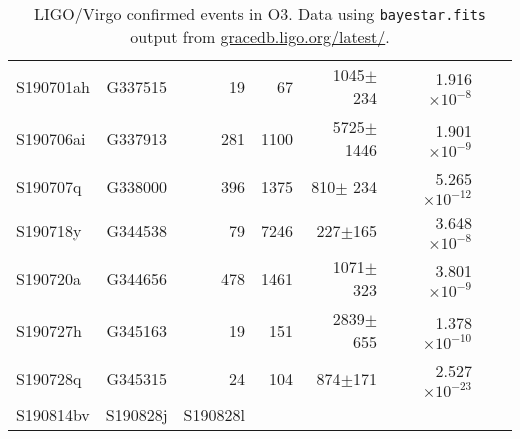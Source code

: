 \begin{table}
\begin{tabular}{  l c r r r r l r }
  S190701ah & G337515 & 19 & 67          & 1045$\pm$234      & 1.916$\times10^{-8}$\\
  S190706ai & G337913 & 281 & 1100     & 5725$\pm$1446    & 1.901$\times10^{-9}$\\
  S190707q & G338000 & 396 & 1375      & 810$\pm$ 234      & 5.265$\times10^{-12}$\\
  S190718y &	G344538 &   79  &	7246  & 227$\pm$165       & 3.648$\times10^{-8}$ \\ 
  S190720a &	G344656	&   478 & 1461  & 1071$\pm$323	  & 3.801$\times10^{-9}$ \\ 
  S190727h & G345163    & 19     & 151    & 2839$\pm$655  & 1.378$\times10^{-10}$ \\
  S190728q & G345315    & 24   & 104     & 874$\pm$171  & 2.527$\times10^{-23}$ \\
  S190814bv & 
  S190828j & 
  S190828l & 
&&&&& \\
\hline
\hline
\end{tabular}
 \caption{LIGO/Virgo confirmed events in O3. Data using {\tt bayestar.fits} output from \href{https://gracedb.ligo.org/latest/}{gracedb.ligo.org/latest/}. }
\end{table}


